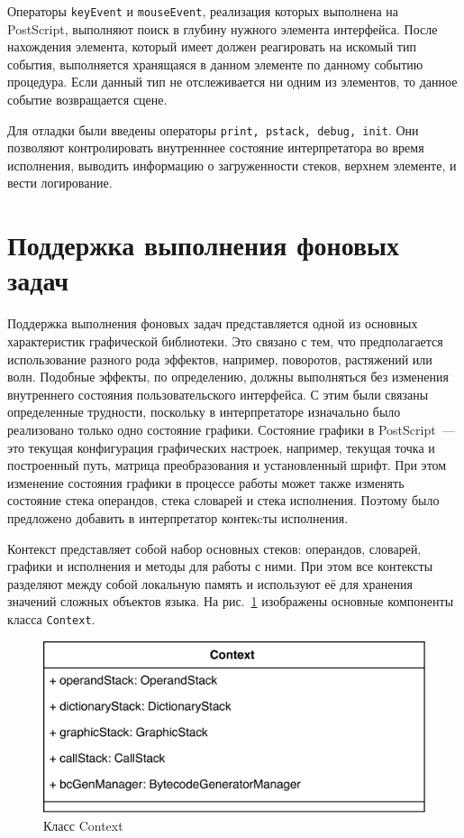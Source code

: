 Операторы \texttt{keyEvent} и \texttt{mouseEvent}, реализация которых выполнена на PostScript, выполняют поиск в глубину нужного элемента интерфейса. После нахождения элемента, который имеет должен реагировать на искомый тип события, выполняется хранящаяся в данном элементе по данному событию процедура. Если данный тип не отслеживается ни одним из элементов, то данное событие возвращается сцене.

Для отладки были введены операторы \texttt{print, pstack, debug, init}. Они позволяют контролировать внутренннее состояние интерпретатора во время исполнения, выводить информацию о загруженности стеков, верхнем элементе, и вести логирование.


\section{Поддержка выполнения фоновых задач}
Поддержка выполнения фоновых задач представляется одной из основных характеристик графической библиотеки. Это связано с тем, что предполагается использование разного рода эффектов, например, поворотов, растяжений или волн. Подобные эффекты, по определению, должны выполняться без изменения внутреннего состояния пользовательского интерфейса. С этим были связаны определенные трудности, поскольку в интерпретаторе изначально было реализовано только одно состояние графики. Состояние графики в PostScript~--- это текущая конфигурация графических настроек, например,   текущая точка и построенный путь, матрица преобразования и установленный шрифт. При этом изменение состояния графики в процессе работы может также изменять состояние стека операндов, стека словарей и стека исполнения. Поэтому было предложено добавить в интерпретатор контекcты исполнения.

Контекст представляет собой набор основных стеков: операндов, словарей, графики и исполнения и методы для работы с ними. При этом все контексты разделяют между собой локальную память и используют её для хранения значений сложных объектов языка. На рис.~\ref{context} изображены основные компоненты класса \texttt{Context}.

\begin{figure}[h!]
\centering
	\includegraphics[width=\textwidth]{Makulov/Context.png}
	\caption{Класс Context}
        \label{context}
\end{figure}


